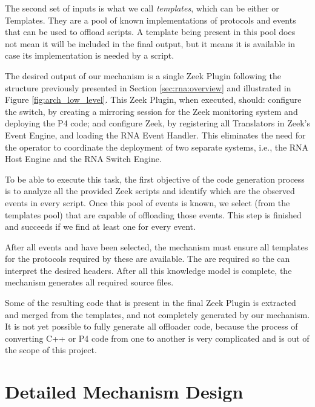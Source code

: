 The second set of inputs is what we call \textit{templates}, which can be either  \ProtocolTemplates{} or \Offloader{} Templates. They are a pool of known implementations of protocols and events that can be used to offload scripts. A template being present in this pool does not mean it will be included in the final output, but it means it is available in case its implementation is needed by a script.

The desired output of our mechanism is a single Zeek Plugin following the structure previously presented in Section \ref{sec:rna:overview} and illustrated in Figure \ref{fig:arch_low_level}. This Zeek Plugin, when executed, should: configure the switch, by creating a mirroring session for the Zeek monitoring system and deploying the P4 code; and configure Zeek, by registering all Translators in Zeek's Event Engine, and loading the RNA Event Handler. This eliminates the need for the operator to coordinate the deployment of two separate systems, i.e., the RNA Host Engine and the RNA Switch Engine.

To be able to execute this task, the first objective of the code generation process is to analyze all the provided Zeek scripts and identify which are the observed events in every script. Once this pool of events is known, we select \Offloaders{} (from the templates pool) that are capable of offloading those events. This step is finished and succeeds if we find at least one \Offloader{} for every event.

After all events and \Offloaders{} have been selected, the mechanism must ensure all templates for the protocols required by these \Offloaders{} are available. The \ProtocolTemplates{} are required so the \Offloaders{} can interpret the desired headers. After all this knowledge model is complete, the mechanism generates all required source files.

Some of the resulting code that is present in the final Zeek Plugin is extracted and merged from the templates, and not completely generated by our mechanism. It is not yet possible to fully generate all offloader code, because the process of converting C++ or P4 code from one to another is very complicated and is out of the scope of this project.



\section{Detailed Mechanism Design}
\label{sec:code_gen_impl}

